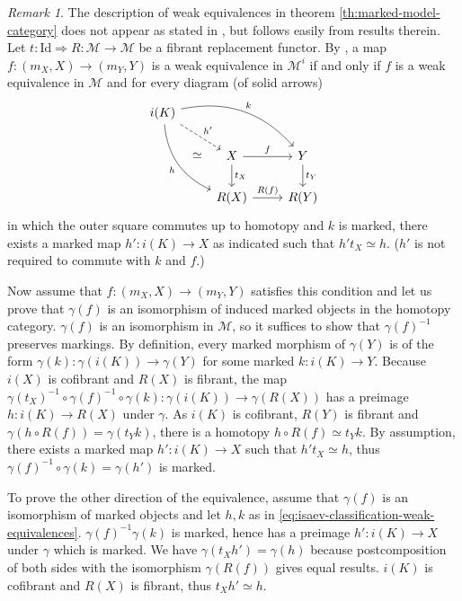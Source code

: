\documentclass[a4paper]{article}
\theoremstyle{remark}
\newtheorem{remark}[theorem]{Remark}
\theoremstyle{definition}
\begin{document}
\begin{remark}
  The description of weak equivalences in theorem \ref{th:marked-model-category} does not appear as stated in \citet{marked-objects}, but follows easily from results therein.
  Let $t : \mathrm{Id} \Rightarrow R : \mathcal{M} \rightarrow \mathcal{M}$ be a fibrant replacement functor.
  By \citet[lemma 2.5]{marked-objects}, a map $f : (m_X, X) \rightarrow (m_Y, Y)$ is a weak equivalence in $\mathcal{M}^i$ if and only if $f$ is a weak equivalence in $\mathcal{M}$ and for every diagram (of solid arrows)
  \begin{equation}
    \label{eq:isaev-classification-weak-equivalences}
    \begin{tikzcd}
      i(K) \arrow[drr, bend left, "k"] \arrow[ddr, bend right, "h"'] \arrow[dr, dashed, "h'"] \arrow[ddr, phantom, "\simeq"] \\
      & X \arrow[d, "t_X"] \arrow[r, "f"] & Y \arrow[d, "t_Y"]  \\
      & R(X) \arrow[r, "R(f)"] & R(Y)
    \end{tikzcd}
  \end{equation}
  in which the outer square commutes up to homotopy and $k$ is marked, there exists a marked map $h' : i(K) \rightarrow X$ as indicated such that $h' t_X \simeq h$.
  ($h'$ is not required to commute with $k$ and $f$.)

  Now assume that $f : (m_X, X) \rightarrow (m_Y, Y)$ satisfies this condition and let us prove that $\gamma(f)$ is an isomorphism of induced marked objects in the homotopy category.
  $\gamma(f)$ is an isomorphism in $\mathcal{M}$, so it suffices to show that $\gamma(f)^{-1}$ preserves markings.
  By definition, every marked morphism of $\gamma(Y)$ is of the form $\gamma(k) : \gamma(i(K)) \rightarrow \gamma(Y)$ for some marked $k : i(K) \rightarrow Y$.
  Because $i(X)$ is cofibrant and $R(X)$ is fibrant, the map $\gamma(t_X)^{-1} \circ \gamma(f)^{-1} \circ \gamma(k) : \gamma(i(K)) \rightarrow \gamma(R(X))$ has a preimage $h : i(K) \rightarrow R(X)$ under $\gamma$.
  As $i(K)$ is cofibrant, $R(Y)$ is fibrant and $\gamma(h \circ R(f)) = \gamma(t_Y k)$, there is a homotopy $h \circ R(f) \simeq t_Y k$.
  By assumption, there exists a marked map $h' : i(K) \rightarrow X$ such that $h' t_X \simeq h$, thus $\gamma(f)^{-1} \circ \gamma(k) = \gamma(h')$ is marked.

  To prove the other direction of the equivalence, assume that $\gamma(f)$ is an isomorphism of marked objects and let $h, k$ as in \eqref{eq:isaev-classification-weak-equivalences}.
  $\gamma(f)^{-1} \gamma(k)$ is marked, hence has a preimage $h' : i(K) \rightarrow X$ under $\gamma$ which is marked.
  We have $\gamma(t_X h') = \gamma(h)$ because postcomposition of both sides with the isomorphism $\gamma(R(f))$ gives equal results.
  $i(K)$ is cofibrant and $R(X)$ is fibrant, thus $t_X h' \simeq h$.
\end{remark}
\end{document}
